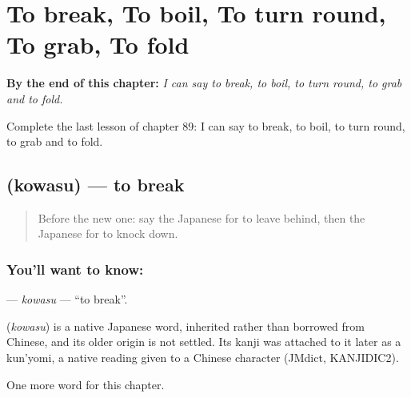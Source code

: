 
\chapter{To break, To boil, To turn round, To grab, To fold}
\label{ch:ja-to-break-to-boil-to-turn-round-to-grab-to-fold}

\begin{chapteropening}
\textbf{By the end of this chapter:} \emph{I can say to break, to boil, to turn round, to grab and to fold.}

Complete the last lesson of chapter 89: I can say to break, to boil, to turn round, to grab and to fold.
\end{chapteropening}

\section[\texorpdfstring{\ja{こわす} (kowasu)}{こわす (kowasu)}]{ (kowasu) — to break}

\label{lesson:JA-C89-kowasu}



\begin{quote}
Before the new one: say the Japanese for to leave behind, then the Japanese for to knock down.
\end{quote}

\subsection*{You'll want to know: }
\textbf{} — \emph{kowasu} — \textquotedblleft{}to break\textquotedblright{}.

\begin{cousinweb}
\textbf{} (\emph{kowasu}) is a native Japanese word, inherited rather than borrowed from Chinese, and its older origin is not settled. Its kanji was attached to it later as a kun'yomi, a native reading given to a Chinese character (JMdict, KANJIDIC2).
\end{cousinweb}

\begin{grammarlens}[title={What you've built}]
One more word for this chapter.
\end{grammarlens}


